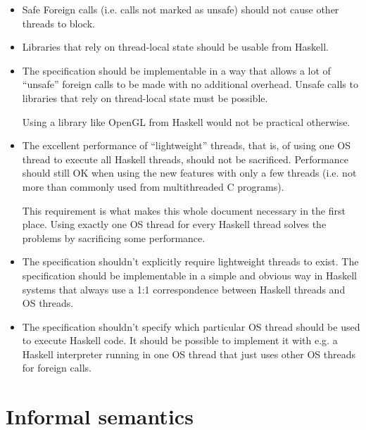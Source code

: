 \documentclass[a4paper,twoside]{article}
\begin{document}
\begin{itemize}
\item Safe Foreign calls (i.e. calls not marked as unsafe) should not cause
other threads to block.

\item Libraries that rely on thread-local state should be usable from Haskell.

\item The specification should be implementable in a way that allows a lot
of ``unsafe'' foreign calls to be made with no additional overhead. Unsafe calls to
libraries that rely on thread-local state must be possible.

Using a library like OpenGL from Haskell would not be practical otherwise.

\item The excellent performance of ``lightweight'' threads, that is, of using one OS thread
to execute all Haskell threads, should not be sacrificed. Performance should still
OK when using the new features with only a few threads (i.e. not more than commonly
used from multithreaded C programs).

This requirement is what makes this whole document necessary in the first place.
Using exactly one OS thread for every Haskell thread solves the problems by sacrificing
some performance.

\item The specification shouldn't explicitly require lightweight threads to exist.
The specification should be implementable in a simple
and obvious way in Haskell systems that always use a 1:1 correspondence
between Haskell threads and OS threads.

\item The specification shouldn't specify which particular OS thread
should be used to execute Haskell code. It should be possible to
implement it with e.g. a Haskell interpreter running in one OS thread
that just uses other OS threads for foreign calls.

\end{itemize}

\newpage
\section{Informal semantics}
\end{document}
